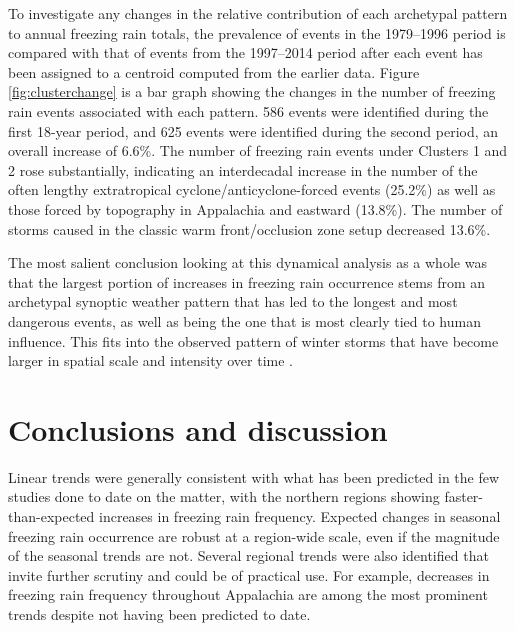 \documentclass[twocol]{ametsoc}
\begin{document}
To investigate any changes in the relative contribution of each archetypal pattern to annual freezing rain totals, the prevalence of events in the 1979--1996 period is compared with that of events from the 1997--2014 period after each event has been assigned to a centroid computed from the earlier data. Figure \ref{fig:clusterchange} is a bar graph showing the changes in the number of freezing rain events associated with each pattern. 586 events were identified during the first 18-year period, and 625 events were identified during the second period, an overall increase of 6.6\%. The number of freezing rain events under Clusters 1 and 2  rose substantially, indicating an interdecadal increase in the number of the often lengthy extratropical cyclone/anticyclone-forced events (25.2\%) as well as those forced by topography in Appalachia and eastward (13.8\%). The number of storms caused in the classic warm front/occlusion zone setup decreased 13.6\%. 



The most salient conclusion looking at this dynamical analysis as a whole was that the largest portion of increases in freezing rain occurrence stems from an archetypal synoptic weather pattern that has led to the longest and most dangerous events, as well as being the one that is most clearly tied to human influence. This fits into the observed pattern of winter storms that have become larger in spatial scale and intensity over time \citep{changnon2007catastrophic}. 



\section{Conclusions and discussion}

Linear trends were generally consistent with what has been predicted in the few studies done to date on the matter, with the northern regions showing faster-than-expected increases in freezing rain frequency. Expected changes in seasonal freezing rain occurrence are robust at a region-wide scale, even if the magnitude of the seasonal trends are not. Several regional trends were also identified that invite further scrutiny and could be of practical use. For example, decreases in freezing rain frequency throughout Appalachia are among the most prominent trends despite not having been predicted to date. 
\end{document}
